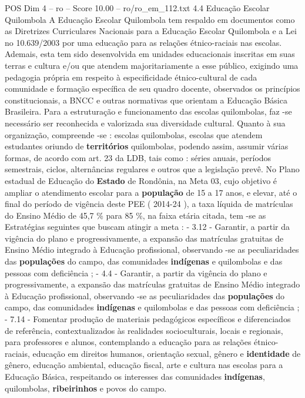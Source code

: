 \begin{textsample}{POS Dim 4 – ro – Score 10.00 – ro/ro\_em\_112.txt}  \label{ex:f4_pos_217}
4.4 Educação Escolar Quilombola A Educação Escolar Quilombola tem respaldo em documentos como as Diretrizes Curriculares Nacionais para a Educação Escolar Quilombola e a Lei no 10.639/2003 por uma educação para as relações étnico-raciais nas escolas.
Ademais, esta tem sido desenvolvida em unidades educacionais inscritas em suas terras e cultura e/ou que atendem majoritariamente a esse público, exigindo uma pedagogia própria em respeito à especificidade étnico-cultural de cada comunidade e formação específica de seu quadro docente, observados os princípios constitucionais, a BNCC e outras normativas que orientam a Educação Básica Brasileira.
Para a estruturação e funcionamento das escolas quilombolas, faz -se necessário ser reconhecida e valorizada sua diversidade cultural.
Quanto à sua organização, compreende -se : escolas quilombolas, escolas que atendem estudantes oriundo de \textbf{territórios} quilombolas, podendo assim, assumir várias formas, de acordo com art. 23 da LDB, tais como : séries anuais, períodos semestrais, ciclos, alternâncias regulares e outros que a legislação prevê.
No Plano estadual de Educação do \textbf{Estado} de Rondônia, na Meta 03, cujo objetivo é ampliar o atendimento escolar para a \textbf{população} de 15 a 17 anos, e elevar, até o final do período de vigência deste PEE ( 2014-24 ), a taxa líquida de matrículas do Ensino Médio de 45,7 \% para 85 \%, na faixa etária citada, tem -se as Estratégias seguintes que buscam atingir a meta : - 3.12 - Garantir, a partir da vigência do plano e progressivamente, a expansão das matrículas gratuitas de Ensino Médio integrado à Educação profissional, observando -se as peculiaridades das \textbf{populações} do campo, das comunidades \textbf{indígenas} e quilombolas e das pessoas com deficiência ; - 4.4 - Garantir, a partir da vigência do plano e progressivamente, a expansão das matrículas gratuitas de Ensino Médio integrado à Educação profissional, observando -se as peculiaridades das \textbf{populações} do campo, das comunidades \textbf{indígenas} e quilombolas e das pessoas com deficiência ; - 7.14 - Fomentar produção de materiais pedagógicos específicos e diferenciados de referência, contextualizados às realidades socioculturais, locais e regionais, para professores e alunos, contemplando a educação para as relações étnico-raciais, educação em direitos humanos, orientação sexual, gênero e \textbf{identidade} de gênero, educação ambiental, educação fiscal, arte e cultura nas escolas para a Educação Básica, respeitando os interesses das comunidades \textbf{indígenas}, quilombolas, \textbf{ribeirinhos} e povos do campo.

\end{textsample}
